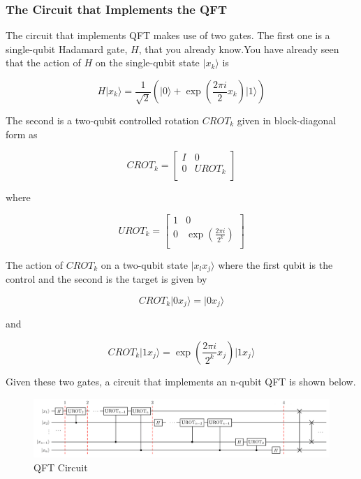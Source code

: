 \documentclass{article}
\begin{document}
\hypertarget{the-circuit-that-implements-the-qft}{%
\subsubsection{\texorpdfstring{The Circuit that Implements the QFT
}{The Circuit that Implements the QFT }}\label{the-circuit-that-implements-the-qft}}

The circuit that implements QFT makes use of two gates. The first one is
a single-qubit Hadamard gate, \(H\), that you already know.You have
already seen that the action of \(H\) on the single-qubit state
\(\vert x_k\rangle\) is

\[H\vert x_k \rangle = \frac{1}{\sqrt{2}}\left(\vert0\rangle + \exp\left(\frac{2\pi i}{2}x_k\right)\vert1\rangle\right)\]

The second is a two-qubit controlled rotation \(CROT_k\) given in
block-diagonal form as

\[CROT_k = \left[\begin{matrix}
I&0\\
0&UROT_k\\
\end{matrix}\right]\]

where

\[UROT_k = \left[\begin{matrix}
1&0\\
0&\exp\left(\frac{2\pi i}{2^k}\right)\\
\end{matrix}\right]\]

The action of \(CROT_k\) on a two-qubit state \(\vert x_l x_j\rangle\)
where the first qubit is the control and the second is the target is
given by

\[CROT_k\vert 0x_j\rangle = \vert 0x_j\rangle\]

and

\[CROT_k\vert 1x_j\rangle = \exp\left( \frac{2\pi i}{2^k}x_j \right)\vert 1x_j\rangle\]

Given these two gates, a circuit that implements an n-qubit QFT is shown below.

\begin{figure}[!htb]
\centering
\includegraphics[width=1\textwidth]{images/qft.png}
\caption{QFT Circuit}
\end{figure}
\end{document}
